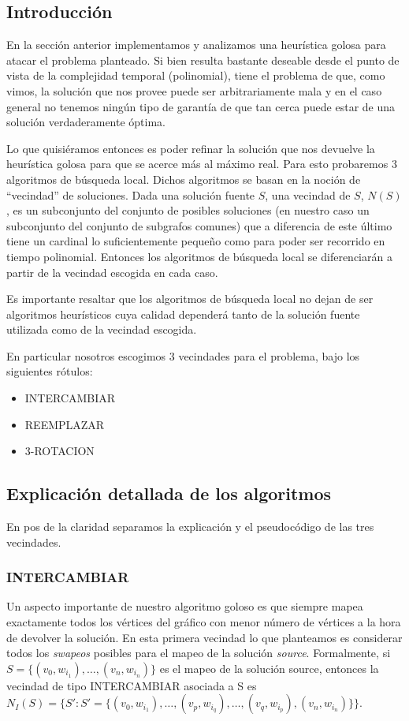 \subsection{Introducción}
En la sección anterior implementamos y analizamos una heurística golosa para atacar el problema planteado. Si bien resulta bastante deseable desde el punto de vista de la complejidad temporal (polinomial), tiene el problema de que, como vimos, la solución que nos provee puede ser arbitrariamente mala y en el caso general no tenemos ningún tipo de garantía de que tan cerca puede estar de una solución verdaderamente óptima.

Lo que quisiéramos entonces es poder refinar la solución que nos devuelve la heurística golosa para que se acerce más al máximo real. Para esto probaremos 3 algoritmos de búsqueda local. Dichos algoritmos se basan en la noción de ``vecindad'' de soluciones. Dada una solución fuente $S$, una vecindad de $S$, $N(S)$, es un subconjunto del conjunto de posibles soluciones (en nuestro caso un subconjunto del conjunto de subgrafos comunes) que a diferencia de este último tiene un cardinal lo suficientemente pequeño como para poder ser recorrido en tiempo polinomial. Entonces los algoritmos de búsqueda local se diferenciarán a partir de la vecindad escogida en cada caso.

Es importante resaltar que los algoritmos de búsqueda local no dejan de ser algoritmos heurísticos cuya calidad dependerá tanto de la solución fuente utilizada como de la vecindad escogida.

En particular nosotros escogimos 3 vecindades para el problema, bajo los siguientes rótulos:
\begin{itemize}
	\item INTERCAMBIAR
	\item REEMPLAZAR
	\item 3-ROTACION 
\end{itemize}

\subsection{Explicación detallada de los algoritmos}
En pos de la claridad separamos la explicación y el pseudocódigo de las tres vecindades.

\subsubsection{INTERCAMBIAR}
Un aspecto importante de nuestro algoritmo goloso es que siempre mapea exactamente todos los vértices del gráfico con menor número de vértices a la hora de devolver la solución. En esta primera vecindad lo que planteamos es considerar todos los \emph{swapeos} posibles para el mapeo de la solución \emph{source}. Formalmente, si $S = \{(v_0, w_{i_1}),\hdots , (v_n, w_{i_n})\}$ es el mapeo de la solución source, entonces la vecindad de tipo INTERCAMBIAR asociada a S es $N_I(S) = \{S' : S' = \{(v_0, w_{i_1}),\hdots , (v_p, w_{i_q}) , \hdots, (v_q, w_{i_p}), (v_n, w_{i_n})\}\}$.

